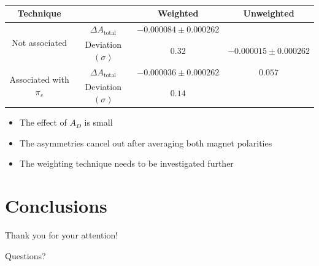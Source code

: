 \documentclass{beamer}
\begin{document}
\begin{frame}
      \frametitle{\insertsubsectionhead}
      \begin{center}
            \scriptsize
            \begin{tabular}{c|c|c|c}
                  Technique & & Weighted & Unweighted\\
                  \hline\hline
                  \multirow{2}{*}{Not associated} & $\Delta A_\text{total}$ & $-0.000084\pm 0.000262$& \\
                  & Deviation $(\sigma)$ & $0.32$& $-0.000015\pm 0.000262$\\
                  \cline{1-3}
                  \multirow{2}{*}{Associated with $\pi_s$} & $\Delta A_\text{total}$ & $-0.000036\pm 0.000262$& $0.057$\\
                  & Deviation $(\sigma)$ & $0.14$& \\
            \end{tabular}
      \end{center}
      \normalsize
      \begin{itemize}
            \item The effect of $A_D$ is small
            \item The asymmetries cancel out after averaging both magnet polarities
            \item The weighting technique needs to be investigated further
      \end{itemize}
\end{frame}

\section{Conclusions}

\begin{frame}
      \LARGE
      \centering
      Thank you for your attention!

      Questions?
\end{frame}
\end{document}
